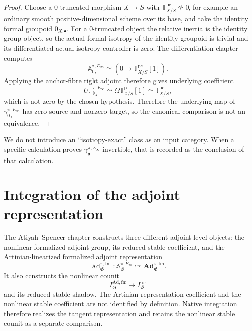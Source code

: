 \begin{proof}
Choose a $0$-truncated morphism $X\to S$ with
$\mathbb T^{\mathrm{pc}}_{X/S}\not\simeq0$, for example an ordinary smooth
positive-dimensional scheme over its base, and take the identity formal
groupoid $0_{X,\bullet}$.  For a $0$-truncated object the relative inertia is
the identity group object, so the actual formal isotropy of the identity
groupoid is trivial and its differentiated actual-isotropy controller is zero.
The differentiation chapter computes
\[
    \mathbb A^{\pi,E_\infty}_{0_X}
    \simeq
    \left(
      0\longrightarrow \mathbb T^{\mathrm{pc}}_{X/S}[1]
    \right).
\]
Applying the anchor-fibre right adjoint therefore gives underlying coefficient
\[
    U\mathbb F^{\pi,E_\infty}_{0_X}
    \simeq
    \Omega\mathbb T^{\mathrm{pc}}_{X/S}[1]
    \simeq
    \mathbb T^{\mathrm{pc}}_{X/S},
\]
which is not zero by the chosen hypothesis.  Therefore the underlying map of
$\gamma^{\pi,E_\infty}_{0_X}$ has zero source and nonzero target, so the
canonical comparison is not an equivalence.
\end{proof}

\begin{remark}
We do not introduce an ``isotropy-exact'' class as an input category.  When a
specific calculation proves
\(\gamma^{\pi,E_\infty}_{\mathfrak a}\) invertible, that is recorded as the
conclusion of that calculation.
\end{remark}

\section{Integration of the adjoint representation}
\label{sec:bnli-adjoint-integration}

The Atiyah--Spencer chapter constructs three different adjoint-level objects:
the nonlinear formalized adjoint group, its reduced stable coefficient, and
the Artinian-linearized formalized adjoint representation
\[
    \operatorname{Ad}^{\pi,\mathrm{fm}}_{\mathfrak G}:
    \mathbb A_{\mathfrak G}^{\pi,E_\infty}
    \curvearrowright
    \mathbf{Ad}_{\mathfrak G}^{\pi,\mathrm{fm}}.
\]
It also constructs the nonlinear counit
\[
    I_{\mathfrak G}^{\mathrm{Ad,fm}}
    \longrightarrow
    I_{\mathfrak G}^{\mathrm{for}}
\]
and its reduced stable shadow.  The Artinian representation coefficient and
the nonlinear stable coefficient are not identified by definition.  Native
integration therefore realizes the tangent representation and retains the
nonlinear stable counit as a separate comparison.

